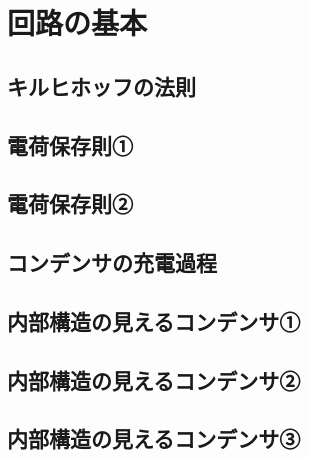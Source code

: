 \documentclass[../../ps_a.tex]{subfiles}
\begin{document}
    \section{回路の基本}
    \vspace{7pt}
    \subsection{キルヒホッフの法則}
        
        \vspace{20pt}    
        \vfill
    \subsection{電荷保存則①}
        
        \vspace{20pt}    
        \vfill
    \subsection{電荷保存則②}
        
        \vspace{20pt}    
        \vfill
    \subsection{コンデンサの充電過程}
        
        \vspace{20pt}    
        \vfill
    \subsection{内部構造の見えるコンデンサ①}
        
        \vspace{20pt}    
        \vfill
    \subsection{内部構造の見えるコンデンサ②}
        
        \vspace{20pt}    
        \vfill
    \subsection{内部構造の見えるコンデンサ③}
        
        \vspace{20pt}    
        \vfill
\end{document}
